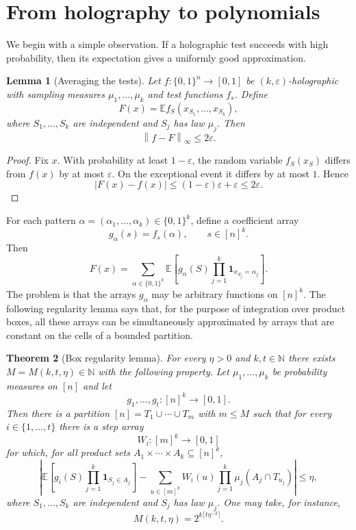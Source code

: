 \documentclass[11pt]{amsart}
\newtheorem{theorem}{Theorem}[section]
\newtheorem{lemma}[theorem]{Lemma}
\newcommand{\E}{\mathbb E}
\newcommand{\N}{\mathbb N}
\newcommand{\1}{\mathbf 1}
\newcommand{\cube}{\{0,1\}}
\newcommand{\norm}[1]{\left\lVert #1\right\rVert}
\newcommand{\abs}[1]{\left\lvert #1\right\rvert}
\begin{document}
\section{From holography to polynomials}

We begin with a simple observation.  If a holographic test succeeds with high probability, then its expectation gives a uniformly good approximation.

\begin{lemma}[Averaging the tests]\label{lem:test-average}
Let $f:\cube^n\to[0,1]$ be $(k,\varepsilon)$-holographic with sampling measures $\mu_1,\ldots,\mu_k$ and test functions $f_s$.  Define
\[
        F(x)=\E f_S(x_{S_1},\ldots,x_{S_k}),
\]
where $S_1,\ldots,S_k$ are independent and $S_j$ has law $\mu_j$.  Then
\[
        \norm{f-F}_{\infty}\leq 2\varepsilon .
\]
\end{lemma}

\begin{proof}
Fix $x$.  With probability at least $1-\varepsilon$, the random variable $f_S(x_S)$ differs from $f(x)$ by at most $\varepsilon$.  On the exceptional event it differs by at most $1$.  Hence
\[
        \abs{F(x)-f(x)}\leq (1-\varepsilon)\varepsilon+\varepsilon\leq2\varepsilon .
\]
\end{proof}

For each pattern $\alpha=(\alpha_1,\ldots,\alpha_k)\in\cube^k$, define a coefficient array
\[
        g_\alpha(s)=f_s(\alpha),\qquad s\in[n]^k.
\]
Then
\[
        F(x)=\sum_{\alpha\in\cube^k}\E
        \left[g_\alpha(S)\prod_{j=1}^k \1_{x_{S_j}=\alpha_j}\right].
\]
The problem is that the arrays $g_\alpha$ may be arbitrary functions on $[n]^k$.  The following regularity lemma says that, for the purpose of integration over product boxes, all these arrays can be simultaneously approximated by arrays that are constant on the cells of a bounded partition.

\begin{theorem}[Box regularity lemma]\label{thm:box-regularity}
For every $\eta>0$ and $k,t\in\N$ there exists $M=M(k,t,\eta)\in\N$ with the following property.  Let $\mu_1,\ldots,\mu_k$ be probability measures on $[n]$ and let
\[
        g_1,\ldots,g_t:[n]^k\to[0,1].
\]
Then there is a partition $[n]=T_1\cup\cdots\cup T_m$ with $m\leq M$ such that for every $i\in\{1,\ldots,t\}$ there is a step array
\[
        W_i:[m]^k\to[0,1]
\]
for which, for all product sets $A_1\times\cdots\times A_k\subseteq[n]^k$,
\[
\left|
\E\left[g_i(S)\prod_{j=1}^k\1_{S_j\in A_j}\right]
-
\sum_{u\in[m]^k} W_i(u)\prod_{j=1}^k\mu_j(A_j\cap T_{u_j})
\right|
\leq \eta ,
\]
where $S_1,\ldots,S_k$ are independent and $S_j$ has law $\mu_j$.  One may take, for instance,
\[
        M(k,t,\eta)=2^{k\lceil t\eta^{-2}\rceil}.
\]
\end{theorem}
\end{document}
